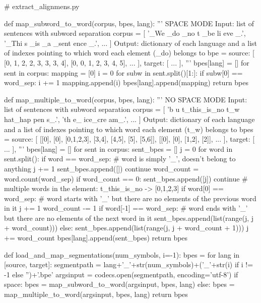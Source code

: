 \begin{python}
# extract_alignmens.py

def map_subword_to_word(corpus, bpes, lang):
  '''
  SPACE MODE
  Input: list of sentences with subword separation
  corpus =  [
      '_We _do _no t _be li eve _.',
      '_Thi s _is _a _sent ence _.',
      ...
  ]
  Output: dictionary of each language and 
  a list of indexes pointing to which word each element (_do) belongs to
  bpe = {
    source:
    [
      [0, 1, 2, 2, 3, 3, 3, 4],
      [0, 0, 1, 2, 3, 4, 5],
      ...
    ],
    target:
    [
      ...
    ],
  }
  '''
  bpes[lang] = []
  for sent in corpus:
    mapping = [0]
    i = 0
    for subw in sent.split()[1:]:
      if subw[0] == word_sep:
        i += 1
      mapping.append(i)
    bpes[lang].append(mapping)
  return bpes

def map_multiple_to_word(corpus, bpes, lang):
  '''
  NO SPACE MODE
  Input: list of sentences with subword separation
  corpus =  [
      'b u t_this_is_no t_w hat_hap pen s_.',
      'th e_ ice_cre am_.',
      ...
  ]
  Output: dictionary of each language and 
  a list of indexes pointing to which word each element (t\_w) belongs to
  bpes = {
    source:
    [
      [[0], [0], [0,1,2,3], [3,4], [4,5], [5], [5,6]],
      [[0], [0], [1,2], [2]],
      ...
    ],
    target:
    [
      ...
    ],
  }
  '''
  bpes[lang] = []
  for sent in corpus:
    sent_bpes = []
    j = 0
    for word in sent.split():
      if word == word_sep:
        # word is simply '_', doesn't belong to anything
        j += 1
        sent_bpes.append([])
        continue
      word_count = word.count(word_sep)
      if word_count == 0:
        sent_bpes.append([j])
        continue
      # multiple words in the element: t_this_is_no -> [0,1,2,3]
      if word[0] == word_sep:
        # word starts with '_' but there are no elements of the previous word in it
        j += 1
        word_count -= 1
      if word[-1] == word_sep:
        # word ends with '_' but there are no elements of the next word in it
        sent_bpes.append(list(range(j, j + word_count)))
      else:
        sent_bpes.append(list(range(j, j + word_count + 1)))
      j += word_count
    bpes[lang].append(sent_bpes)
  return bpes

def load_and_map_segmentations(num_symbols, i=-1):
  bpes = {}
  for lang in [source, target]:
    segmentpath = lang+'_'+str(num_symbols)+('_'+str(i) if i != -1 else '')+'.bpe'
    argsinput = codecs.open(segmentpath, encoding='utf-8')
    if space:
        bpes = map_subword_to_word(argsinput, bpes, lang)
    else:
        bpes = map_multiple_to_word(argsinput, bpes, lang)
  return bpes
\end{python}

